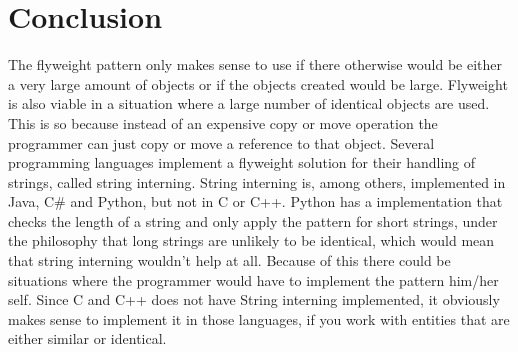 \section{Conclusion}
The flyweight pattern only makes sense to use if there otherwise would be either a very large amount of objects or if the objects created would be large.
Flyweight is also viable in a situation where a large number of identical objects are used. This is so because instead of an expensive copy or move operation the programmer can just copy or move a reference to that object.
Several programming languages implement a flyweight solution for their handling of strings, called string interning.
String interning is, among others, implemented in Java, C\# and Python, but not in C or C++. Python has a implementation that checks the length of a string and only apply the pattern for short strings, under the philosophy that long strings are unlikely to be identical, which would mean that string interning wouldn't help at all. Because of this there could be situations where the programmer would have to implement the pattern him/her self.
Since C and C++ does not have String interning implemented, it obviously makes sense to implement it in those languages, if you work with entities that are either similar or identical.
